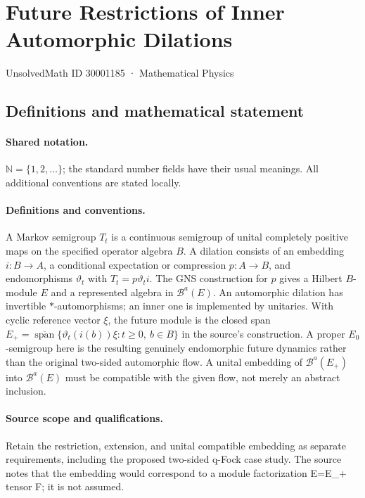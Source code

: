 \documentclass[11pt]{article}
\begin{document}
\setcounter{section}{30001184}
\section{Future Restrictions of Inner Automorphic Dilations}\label{30001185}
{\small UnsolvedMath ID 30001185 · Mathematical Physics}
\subsection{Definitions and mathematical statement}

\paragraph{Shared notation.}$\mathbb N=\{1,2,\ldots\}$; the standard number fields have their usual meanings. All additional conventions are stated locally.


\paragraph{Definitions and conventions.} A Markov semigroup $T_t$ is a continuous semigroup of unital completely positive maps on the specified operator algebra $B$. A dilation consists of an embedding $i:B\to A$, a conditional expectation or compression $p:A\to B$, and endomorphisms $\vartheta_t$ with $T_t=p\vartheta_t i$. The GNS construction for $p$ gives a Hilbert $B$-module $E$ and a represented algebra in $\mathcal B^a(E)$. An automorphic dilation has invertible $*$-automorphisms; an inner one is implemented by unitaries. With cyclic reference vector $\xi$, the future module is the closed span $E_+=\overline{\operatorname{span}}\{\vartheta_t(i(b))\xi:t\ge0,\ b\in B\}$ in the source's construction. A proper $E_0$-semigroup here is the resulting genuinely endomorphic future dynamics rather than the original two-sided automorphic flow. A unital embedding of $\mathcal B^a(E_+)$ into $\mathcal B^a(E)$ must be compatible with the given flow, not merely an abstract inclusion.

\paragraph{Source scope and qualifications.} Retain the restriction, extension, and unital compatible embedding as separate requirements, including the proposed two-sided q-Fock case study. The source notes that the embedding would correspond to a module factorization E=E\_+ tensor F; it is not assumed.
\end{document}
